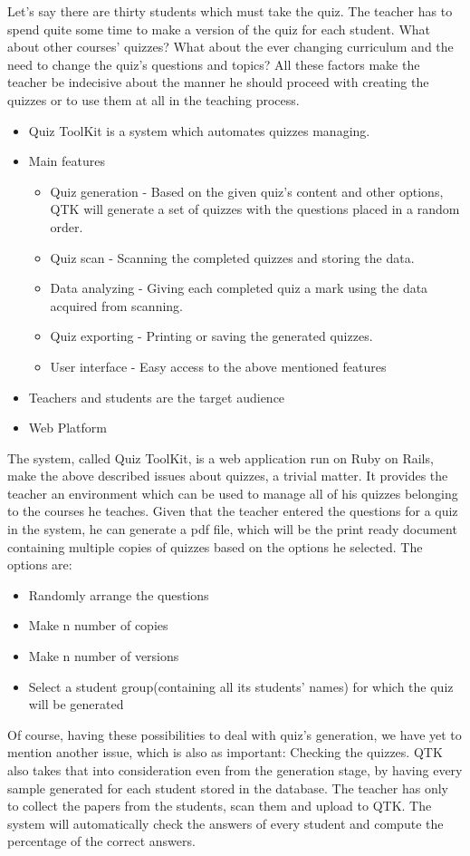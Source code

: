 Let’s say there are thirty students which must take the quiz. The teacher has to spend quite some time to make a version of the quiz for each student. What about other courses’ quizzes? What about the ever changing curriculum and the need to change the quiz’s questions and topics? All these factors make the teacher be indecisive about the manner he should proceed with creating the quizzes or to use them at all in the teaching process. 
\begin{itemize}
  \item Quiz ToolKit is a system which automates quizzes managing.
  \item Main features
  \begin{itemize}

    \item Quiz generation - Based on the given quiz’s content and other options, QTK will generate a set of quizzes with the questions placed in a random order.
    \item Quiz scan - Scanning the completed quizzes and storing the data.
    \item Data analyzing - Giving each completed quiz a mark using the data acquired from scanning.
    \item Quiz exporting - Printing or saving the generated quizzes.
    \item User interface - Easy access to the above mentioned features
  \end{itemize}
  \item Teachers and students are the target audience
  \item Web Platform
\end{itemize}


The system, called Quiz ToolKit,  is a web application run on Ruby on Rails, make the above described issues about quizzes, a trivial matter. It provides the teacher an environment which can be used to manage all of his quizzes belonging to the courses he teaches. Given that the teacher entered the questions for a quiz in the system, he can generate a pdf file, which will be the print ready document containing multiple copies of quizzes based on the options he selected. The options are: 
\begin{itemize}
  \item Randomly arrange the questions
  \item Make n number of copies
  \item Make n number of versions
  \item Select a student group(containing all its students’ names) for which the quiz will be generated    
\end{itemize}
Of course, having these possibilities to deal with quiz’s generation, we have yet to mention another issue, which is also as important: Checking the quizzes. QTK also takes that into consideration even from the generation stage, by having every sample generated for each student stored in the database. The teacher has only to collect the papers from the students, scan them and upload to QTK. The system will automatically check the answers of every student and compute the percentage of the correct answers.

\clearpage
